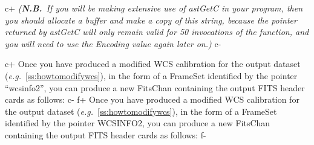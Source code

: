 \documentclass[twoside,11pt]{article}
\newcommand{\secref}[1]{\S\ref{#1}}
\renewcommand{\secref}[1]{\ref{#1}}
\begin{document}
c+
{\em{({\bf{N.B.}}\ If you will be making extensive use of astGetC in
your program, then you should allocate a buffer and make a copy of
this string, because the pointer returned by astGetC will only remain
valid for 50 invocations of the function, and you will need to use the
Encoding value again later on.)}}
c-

c+
Once you have produced a modified WCS calibration for the output
dataset ({\em{e.g.}}\ \secref{ss:howtomodifywcs}), in the form of a
FrameSet identified by the pointer ``wcsinfo2'', you can produce a new
FitsChan containing the output FITS header cards as follows:
c-
f+
Once you have produced a modified WCS calibration for the output
dataset ({\em{e.g.}}\ \secref{ss:howtomodifywcs}), in the form of a
FrameSet identified by the pointer WCSINFO2, you can produce a new
FitsChan containing the output FITS header cards as follows:
f-
\end{document}
